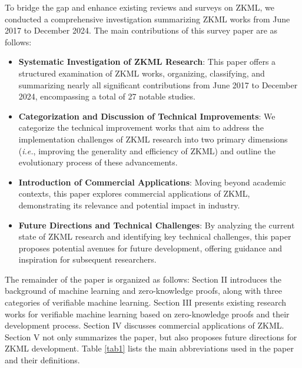 \documentclass[journal]{IEEEtran}
\begin{document}
To bridge the gap and enhance existing reviews and surveys on ZKML, we conducted a comprehensive investigation summarizing ZKML works from June 2017 to December 2024. The main contributions of this survey paper are as follows:
\begin{itemize}
    \item \textbf{Systematic Investigation of ZKML Research}: This paper offers a structured examination of ZKML works, organizing, classifying, and summarizing nearly all significant contributions from June 2017 to December 2024, encompassing a total of 27 notable studies.
    
    \item \textbf{Categorization and Discussion of Technical Improvements}: We categorize the technical improvement works that aim to address the implementation challenges of ZKML research into two primary dimensions (\emph{i.e.}, improving the generality and efficiency of ZKML) and outline the evolutionary process of these advancements.
    
    \item \textbf{Introduction of Commercial Applications}: Moving beyond academic contexts, this paper explores commercial applications of ZKML, demonstrating its relevance and potential impact in industry.
    
    \item \textbf{Future Directions and Technical Challenges}: By analyzing the current state of ZKML research and identifying key technical challenges, this paper proposes potential avenues for future development, offering guidance and inspiration for subsequent researchers.
\end{itemize}

The remainder of the paper is organized as follows: Section II introduces the background of machine learning and zero-knowledge proofs, along with three categories of verifiable machine learning. Section III presents existing research works for verifiable machine learning based on zero-knowledge proofs and their development process. Section IV discusses commercial applications of ZKML. Section V not only summarizes the paper, but also proposes future directions for ZKML development. Table \ref{tab1} lists the main abbreviations used in the paper and their definitions.
\end{document}
